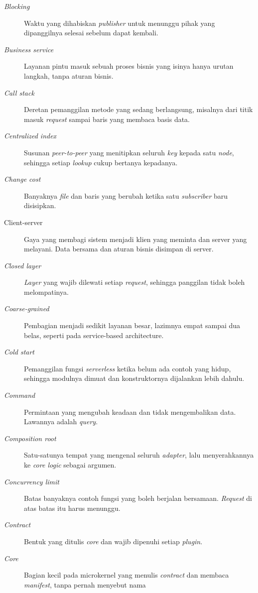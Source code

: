 \begin{description}
  \item[\textit{Blocking}] Waktu yang dihabiskan \textit{publisher} untuk
    menunggu pihak yang dipanggilnya selesai sebelum dapat kembali.
  \item[\textit{Business service}] Layanan pintu masuk sebuah proses bisnis
    yang isinya hanya urutan langkah, tanpa aturan bisnis.
  \item[\textit{Call stack}] Deretan pemanggilan metode yang sedang berlangsung,
    misalnya dari titik masuk \textit{request} sampai baris yang membaca basis
    data.
  \item[\textit{Centralized index}] Susunan \textit{peer-to-peer} yang menitipkan
    seluruh \textit{key} kepada satu \textit{node}, sehingga setiap
    \textit{lookup} cukup bertanya kepadanya.
  \item[\textit{Change cost}] Banyaknya \textit{file} dan baris yang berubah
    ketika satu \textit{subscriber} baru disisipkan.
  \item[Client-server] Gaya yang membagi sistem menjadi klien yang meminta dan
    server yang melayani. Data bersama dan aturan bisnis disimpan di server.
  \item[\textit{Closed layer}] \textit{Layer} yang wajib dilewati setiap
    \textit{request}, sehingga panggilan tidak boleh melompatinya.
  \item[\textit{Coarse-grained}] Pembagian menjadi sedikit layanan besar, lazimnya empat sampai
    dua belas, seperti pada service-based architecture.
  \item[\textit{Cold start}] Pemanggilan fungsi \textit{serverless} ketika belum
    ada contoh yang hidup, sehingga modulnya dimuat dan konstruktornya dijalankan
    lebih dahulu.
  \item[\textit{Command}] Permintaan yang mengubah keadaan dan tidak
    mengembalikan data. Lawannya adalah \textit{query}.
  \item[\textit{Composition root}] Satu-satunya tempat yang mengenal seluruh
    \textit{adapter}, lalu menyerahkannya ke \textit{core logic} sebagai
    argumen.
  \item[\textit{Concurrency limit}] Batas banyaknya contoh fungsi yang boleh
    berjalan bersamaan. \textit{Request} di atas batas itu harus menunggu.
  \item[\textit{Contract}] Bentuk yang ditulis \textit{core} dan wajib dipenuhi
    setiap \textit{plugin}.
  \item[\textit{Core}] Bagian kecil pada microkernel yang menulis
    \textit{contract} dan membaca \textit{manifest}, tanpa pernah menyebut nama

\end{description}
